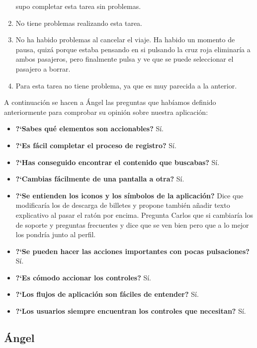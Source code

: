 \begin{enumerate}
        supo completar esta tarea sin problemas.
    \item No tiene problemas realizando esta tarea.
    \item No ha habido problemas al cancelar el viaje. Ha habido un momento de pausa, quizá porque estaba pensando en si pulsando la cruz roja eliminaría
        a ambos pasajeros, pero finalmente pulsa y ve que se puede seleccionar el pasajero a borrar.
    \item Para esta tarea no tiene problema, ya que es muy parecida a la anterior.
\end{enumerate}

A continuación se hacen a Ángel las preguntas que habíamos definido anteriormente para comprobar su opinión sobre nuestra aplicación:

\begin{itemize}
    \item \textbf{?`Sabes qué elementos son accionables?} Sí. 
    \item \textbf{?`Es fácil completar el proceso de registro?} Sí. 
    \item \textbf{?`Has conseguido encontrar el contenido que buscabas?} Sí.
    \item \textbf{?`Cambias fácilmente de una pantalla a otra?} Sí.
    \item \textbf{?`Se entienden los iconos y los símbolos de la aplicación?} Dice que modificaría los de descarga de billetes y propone
        también añadir texto explicativo al pasar el ratón por encima. Pregunta Carlos que si cambiaría los de soporte y preguntas frecuentes
        y dice que se ven bien pero que a lo mejor los pondría junto al perfil.
    \item \textbf{?`Se pueden hacer las acciones importantes con pocas pulsaciones?} Sí.
    \item \textbf{?`Es cómodo accionar los controles?} Sí.
    \item \textbf{?`Los flujos de aplicación son fáciles de entender?} Sí.
    \item \textbf{?`Los usuarios siempre encuentran los controles que necesitan?} Sí.
\end{itemize}

\subsection{Ángel}

